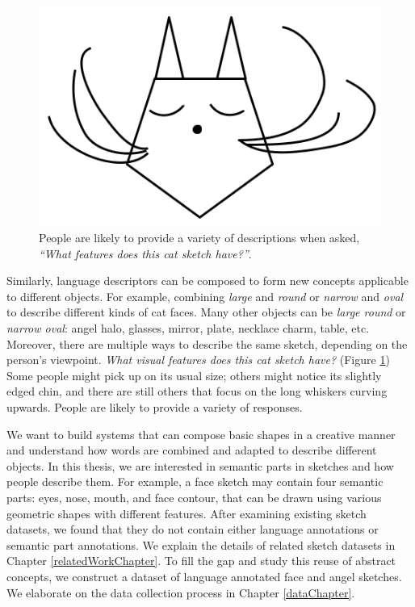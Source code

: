 \begin{figure}[!htb]
\centering
\includegraphics[width=.3\linewidth]{introduction/catFace.png}  
\caption{People are likely to provide a variety of descriptions when asked, \textit{``What features does this cat sketch have?''}.}
\label{introduction.cat.face}
\end{figure}

Similarly, language descriptors can be composed to form new concepts applicable to different objects. For example, combining \textit{large} and \textit{round} or \textit{narrow} and \textit{oval} to describe different kinds of cat faces.
Many other objects can be \textit{large round} or \textit{narrow oval}: angel halo, glasses, mirror, plate, necklace charm, table, etc.
Moreover, there are multiple ways to describe the same sketch, depending on the person's viewpoint. \textit{What visual features does this cat sketch have?} (Figure \ref{introduction.cat.face}) Some people might pick up on its usual size; others might notice its slightly edged chin, and there are still others that focus on the long whiskers curving upwards. People are likely to provide a variety of responses.  

We want to build systems that can compose basic shapes in a creative manner and understand how words are combined and adapted to describe different objects.  
In this thesis, we are interested in semantic parts in sketches and how people describe them. For example, a face sketch may contain four semantic parts: eyes, nose, mouth, and face contour, that can be drawn using various geometric shapes with different features. After examining existing sketch datasets, we found that they do not contain either language annotations or semantic part annotations. We explain the details of related sketch datasets in Chapter \ref{relatedWorkChapter}. To fill the gap and study this reuse of abstract concepts, we construct a dataset of language annotated face and angel sketches. We elaborate on the data collection process in Chapter \ref{dataChapter}.  

